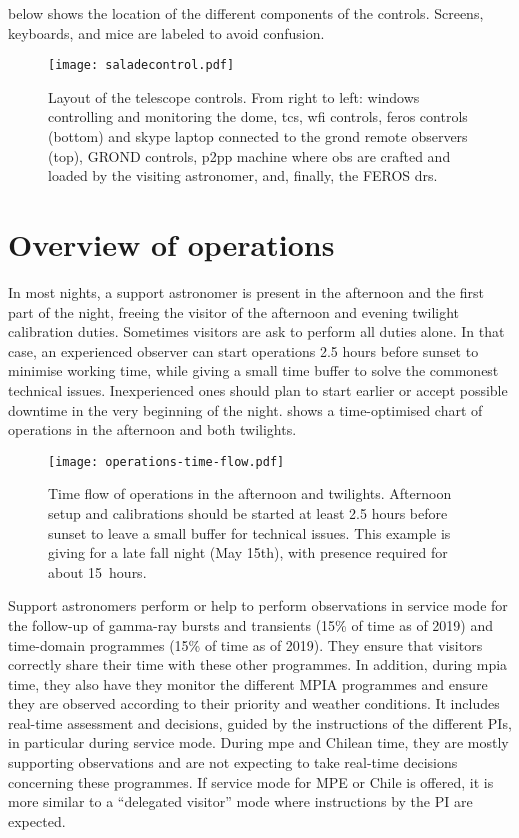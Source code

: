 \documentclass[11pt,fleqn,a4paper]{book}
\begin{document}
  below shows the location of the different components of the controls.  Screens, keyboards, and mice are labeled to avoid confusion.

\begin{figure}[!ht] \texttt{[image: saladecontrol.pdf]}
\caption[Layout of the telescope controls]{Layout of the telescope controls.  From right to left: \gls{windows} 
controlling and monitoring the \gls{dome}, \acrlong{tcs}, \acrshort{wfi} controls,
\acrshort{feros} controls (bottom) and skype laptop connected to the \acrshort{grond} remote observers (top), GROND controls, \acrshort{p2pp} machine where
\acrshort{ob}s are crafted and loaded by the visiting astronomer, and,
finally, the FEROS \acrlong{drs}.}
\label{fig:saladecontrol} 
\end{figure}

\section{Overview of operations}

In most nights, a support astronomer is present in the afternoon and the first part of the night, freeing the \gls{visitor} of the afternoon and evening twilight calibration duties.  Sometimes visitors are ask to perform all duties alone.  In that case, an experienced observer can start operations 2.5 hours before sunset to minimise working time, while giving a small time buffer to solve the commonest technical issues.  Inexperienced ones should plan to start earlier or accept possible downtime in the very beginning of the night.  shows a time-optimised chart of operations in the afternoon and both twilights.

\begin{figure}[!ht]
\texttt{[image: operations-time-flow.pdf]}
\caption[Time flow of afternoon and twilight observations]{Time flow of operations in the afternoon and twilights. Afternoon setup and calibrations should be started at least 2.5 hours before sunset to leave a small buffer for technical issues. This example is giving for a late fall night (May 15th), with presence required for about 15~hours.}
\label{fig:timeflow}
\end{figure}

Support astronomers perform or help to perform observations in \gls{service} mode for the follow-up of gamma-ray bursts and transients (15\% of time as of 2019) and time-domain programmes (15\% of time as of 2019). They ensure that \glspl{visitor} correctly share their time with these other programmes.  In addition, during \gls{mpia} time, they also have they monitor the different MPIA programmes and ensure they are observed according to their priority and weather conditions. It includes real-time assessment and decisions, guided by the instructions of the different PIs, in particular during service mode.  During \gls{mpe} and Chilean time, they are mostly supporting observations and are not expecting to take real-time decisions concerning these programmes.  If service mode for MPE or Chile is offered, it is more similar to a ``delegated visitor'' mode where instructions by the PI are expected.
\end{document}

